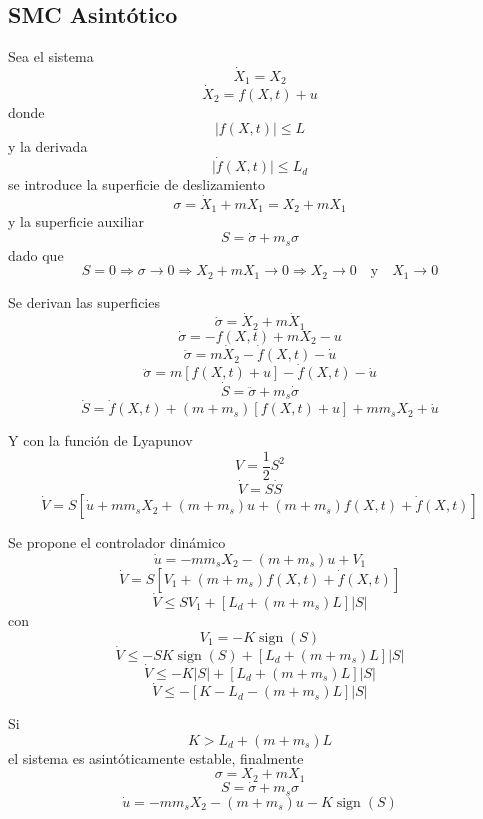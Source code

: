 \clearpage
\begin{flushright}
\end{flushright}

\subsection{SMC Asintótico}

Sea el sistema
\[
  \dot{X}_1=X_2
\]
\[
  \dot{X}_2=f(X,t)+u
\]
donde
\[
  \lvert f(X,t)\rvert\leq L
\]
y la derivada
\[
  \lvert\dot{f}(X,t)\rvert\leq L_d
\]
se introduce la superficie de deslizamiento
\[
  \sigma=\dot{X}_1+mX_1=X_2+mX_1
\]
y la superficie auxiliar
\[
  S=\dot{\sigma}+m_s\sigma
\]
dado que
\[
  S=0\Rightarrow\sigma\to0
  \Rightarrow X_2+mX_1\to0
  \Rightarrow X_2\to0 \quad\text{y}\quad X_1\to0
\]

Se derivan las superficies
\[
  \dot{\sigma}=\dot{X}_2+m\dot{X}_1
\]
\[
  \dot{\sigma}=-f(X,t)+mX_2-u
\]
\[
  \ddot{\sigma}=m\dot{X}_2-\dot{f}(X,t)-\dot{u}
\]
\[
  \ddot{\sigma}=m[f(X,t)+u]-\dot{f}(X,t)-\dot{u}
\]
\[
  \dot{S}=\ddot{\sigma}+m_s\dot{\sigma}
\]
\[
  \dot{S}=\dot{f}(X,t)+(m+m_s)[f(X,t)+u]+mm_sX_2+\dot{u}
\]

Y con la función de Lyapunov
\[
  V=\frac{1}{2}S^2
\]
\[
  \dot{V}=S\dot{S}
\]
\[
  \dot{V}=S\left[
    \dot{u}+mm_sX_2+(m+m_s)u
    +(m+m_s)f(X,t)+\dot{f}(X,t)
  \right]
\]

Se propone el controlador dinámico
\[
  \dot{u}=-mm_sX_2-(m+m_s)u+V_1
\]
\[
  \dot{V}=S\left[V_1+(m+m_s)f(X,t)+\dot{f}(X,t)\right]
\]
\[
  \dot{V}\leq SV_1+\left[L_d+(m+m_s)L\right]\lvert S\rvert
\]
con
\[
  V_1=-K\operatorname{sign}(S)
\]
\[
  \dot{V}\leq-SK\operatorname{sign}(S)
  +\left[L_d+(m+m_s)L\right]\lvert S\rvert
\]
\[
  \dot{V}\leq-K\lvert S\rvert
  +\left[L_d+(m+m_s)L\right]\lvert S\rvert
\]
\[
  \dot{V}\leq-\left[K-L_d-(m+m_s)L\right]\lvert S\rvert
\]

Si
\[
  K>L_d+(m+m_s)L
\]
el sistema es asintóticamente estable, finalmente
\[
  \sigma=X_2+mX_1
\]
\[
  S=\dot{\sigma}+m_s\sigma
\]
\[
  \dot{u}=-mm_sX_2-(m+m_s)u-K\operatorname{sign}(S)
\]


